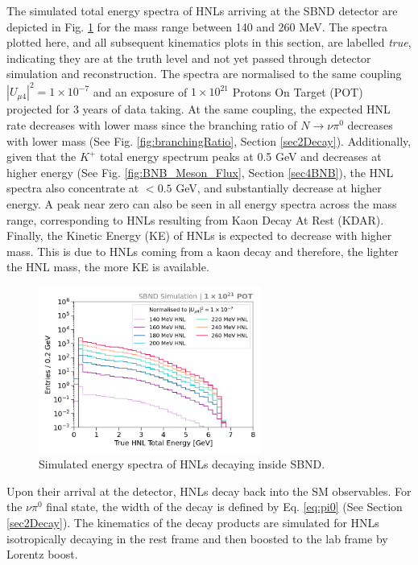 The simulated total energy spectra of HNLs arriving at the SBND detector are depicted in Fig. \ref{fig:HNL_Energy_Spectrum} for the mass range between 140 and 260 MeV.
The spectra plotted here, and all subsequent kinematics plots in this section, are labelled \textit{true}, indicating they are at the truth level and not yet passed through detector simulation and reconstruction.
The spectra are normalised to the same coupling $|U_{\mu4}|^{2} = 1 \times 10^{-7}$ and an exposure of $1 \times 10^{21}$ Protons On Target (POT) projected for 3 years of data taking.
At the same coupling, the expected HNL rate decreases with lower mass since the branching ratio of $N \rightarrow \nu\pi^0$ decreases with lower mass (See Fig. \ref{fig:branchingRatio}, Section \ref{sec2Decay}).
Additionally, given that the $K^{+}$ total energy spectrum peaks at 0.5 GeV and decreases at higher energy (See Fig. \ref{fig:BNB_Meson_Flux}, Section \ref{sec4BNB}), the HNL spectra also concentrate at $<0.5$ GeV, and substantially decrease at higher energy. 
A peak near zero can also be seen in all energy spectra across the mass range, corresponding to HNLs resulting from Kaon Decay At Rest (KDAR).
Finally, the Kinetic Energy (KE) of HNLs is expected to decrease with higher mass.
This is due to HNLs coming from a kaon decay and therefore, the lighter the HNL mass, the more KE is available.

\begin{figure}[hb!] 
\centering    
\includegraphics[width=0.65\textwidth]{HNL_Energy_Spectrum}
\caption[Simulated Energy Spectra of HNLs Decaying Inside SBND]{
Simulated energy spectra of HNLs decaying inside SBND.
}
\label{fig:HNL_Energy_Spectrum}
\end{figure}

Upon their arrival at the detector, HNLs decay back into the SM observables.
For the $\nu\pi^{0}$ final state, the width of the decay is defined by Eq. \ref{eq:pi0} (See Section \ref{sec2Decay}).
The kinematics of the decay products are simulated for HNLs isotropically decaying in the rest frame and then boosted to the lab frame by Lorentz boost.


